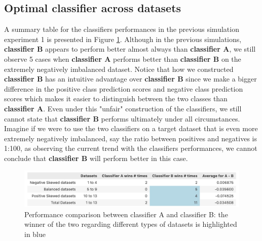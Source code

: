 \documentclass[12pt, oneside]{amsart}
\theoremstyle{definition}
\theoremstyle{remark}
\numberwithin{equation}{section}
\begin{document}
\subsection{Optimal classifier across datasets}
A summary table for the classifiers performances in the previous simulation experiment 1 is presented in Figure \ref{simulation1_table}. Although in the previous simulations, \textbf{classifier B} appears to perform better almost always than \textbf{classifier A}, we still observe 5 cases when \textbf{classifier A} performs better than \textbf{classifier B} on the extremely negatively imbalanced dataset. Notice that how we constructed \textbf{classifier B} has an intuitive advantage over \textbf{classifier B} since we make a bigger difference in the positive class prediction scores and negative class prediction scores which makes it easier to distinguish between the two classes than \textbf{classifier A}.  Even under this "unfair" construction of the classifiers, we still cannot state that \textbf{classifier B} performs ultimately under all circumstances. Imagine if we were to use the two classifiers on a target dataset that is even more extremely negatively imbalanced, say the ratio between positives and negatives is 1:100, as observing the current trend with the classifiers performances, we cannot conclude that \textbf{classifier B} will perform better in this case. 

\begin{figure}[hbt!]
    \centering
    \includegraphics[scale=0.3]{Report/Figure/simulation1_table.jpg}
    \caption{Performance comparison between classifier A and classifier B: the winner of the two regarding different types of datasets is highlighted in blue}
    \label{simulation1_table}
\end{figure}
\FloatBarrier
\end{document}
